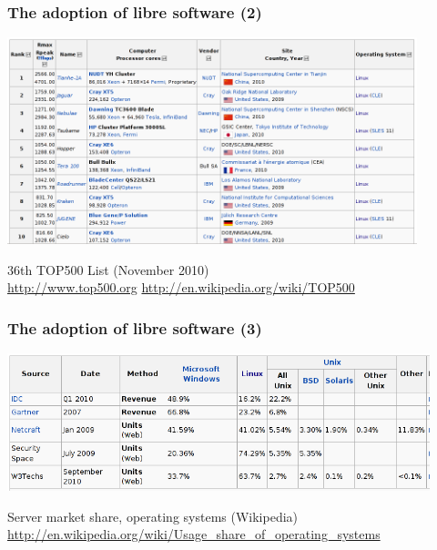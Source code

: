 
\begin{frame}
\frametitle{The adoption of libre software (2)}

\includegraphics[height=6cm]{figs/top-10-supercomputers-2010-11}

\begin{flushright}
36th TOP500 List (November 2010) \\
{\small \url{http://www.top500.org} \url{http://en.wikipedia.org/wiki/TOP500}} 
\end{flushright}
\end{frame}


\begin{frame}
\frametitle{The adoption of libre software (3)}

\begin{center}
\includegraphics[height=4cm]{figs/server-os-share-2010}
\end{center}

\begin{flushright}
Server market share, operating systems (Wikipedia) \\
{\footnotesize \url{http://en.wikipedia.org/wiki/Usage_share_of_operating_systems}} 
\end{flushright}
\end{frame}


